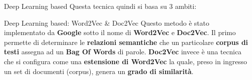 \documentclass[british]{beamer}
\begin{document}
\begin{frame}{Deep Learning based}
	Questa tecnica quindi si basa su 3 ambiti:
	\begin{figure}[!hf]
		\centering
	\end{figure}
\end{frame}
	
\begin{frame}{Deep Learning based: Word2Vec \& Doc2Vec}
	Questo metodo \`{e} stato implementato da \textbf{Google} sotto il nome di \textbf{Word2Vec} e \textbf{Doc2Vec}.
	Il primo permette di determinare le \textbf{relazioni semantiche} che un particolare \textbf{corpus di testi} assegna ad un \textbf{Bag Of Words} di parole.
	\textbf{Doc2Vec} invece \`{e} una tecnica che si configura come una \textbf{estensione di Word2Vec} la quale, preso in ingresso un set di documenti (corpus), genera un \textbf{grado di similarit\`{a}}.
\end{frame}
\end{document}
